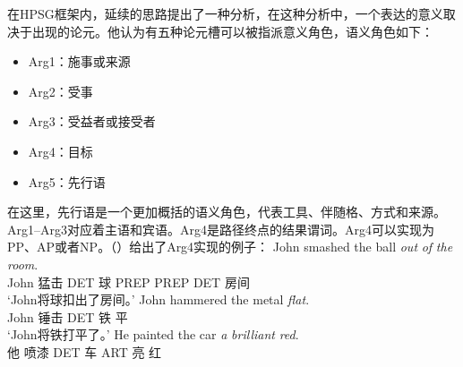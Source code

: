 \begin{exe}
\begin{xlist}[iv.]
\begin{exe}
\begin{xlist}[iv.]
\mbox{}\citet{Haugereid2007a}在HPSG框架内，延续\citet{Borer2005a-u}的思路提出了一种分析，在这种分析中，一个表达的意义取决于出现的论元。他认为有五种论元槽可以被指派意义角色，语义角色如下：
\begin{itemize}
\item Arg1：施事或来源
\item Arg2：受事
\item Arg3：受益者或接受者
\item Arg4：目标
\item Arg5：先行语
\end{itemize}
在这里，先行语是一个更加概括的语义角色，代表工具、伴随格、方式和来源。Arg1--Arg3对应着主语和宾语。Arg4是路径终点的结果谓词。Arg4可以实现为PP、AP或者NP。（）给出了Arg4实现的例子：
\eal
\ex 
\gll John smashed the ball \emph{out} \emph{of} \emph{the} \emph{room}.\\
     John 猛击 DET 球 PREP PREP DET 房间\\
\glt `John将球扣出了房间。'
\ex 
\gll John hammered the metal \emph{flat}.\\
     John 锤击 DET 铁 平\\
\glt `John将铁打平了。'
\ex 
\gll He painted the car \emph{a} \emph{brilliant} \emph{red}.\\
     他 喷漆 DET 车 ART 亮 红\\

\end{xlist}
\end{exe}
\end{xlist}
\end{exe}
